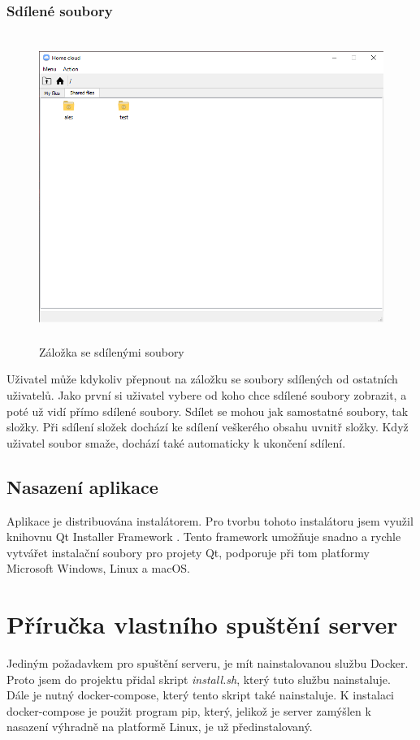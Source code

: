 \documentclass[
  glossaries,
]{kidiplom}
\begin{document}
\subsubsection{Sdílené soubory}
\begin{figure}[htp]
    \centering
    \includegraphics[width=14cm,height=10cm,keepaspectratio]{shared}
    \caption{Záložka se sdílenými soubory}
    \label{fig:shared}
\end{figure}
Uživatel může kdykoliv přepnout na záložku se soubory sdílených od ostatních uživatelů. Jako první si uživatel vybere od koho chce sdílené soubory zobrazit, a poté už vidí přímo sdílené soubory. Sdílet se mohou jak samostatné soubory, tak složky. Při sdílení složek dochází ke sdílení veškerého obsahu uvnitř složky. Když uživatel soubor smaže, dochází také automaticky k ukončení sdílení.
\subsection{Nasazení aplikace}
Aplikace je distribuována instalátorem. Pro tvorbu tohoto instalátoru jsem využil knihovnu Qt Installer Framework \cite{QTINSTALLER}. Tento framework umožňuje snadno a rychle vytvářet instalační soubory pro projety Qt, podporuje při tom platformy Microsoft Windows, Linux a macOS.
\clearpage
\section{Příručka vlastního spuštění server}
Jediným požadavkem pro spuštění serveru, je mít nainstalovanou službu Docker. Proto jsem do projektu přidal skript \textit{install.sh}, který tuto službu nainstaluje. Dále je nutný docker-compose, který tento skript také nainstaluje. K instalaci docker-compose je použit program pip, který, jelikož je server zamýšlen k nasazení výhradně na platformě Linux, je už předinstalovaný.
\end{document}
